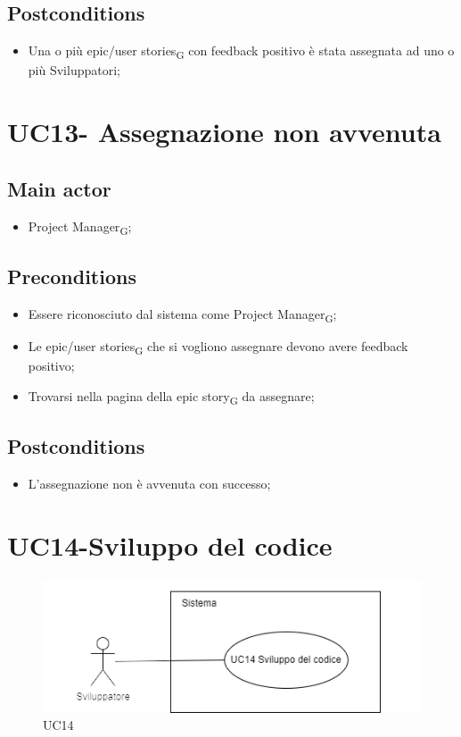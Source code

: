 \documentclass{article}
\begin{document}
    \subsection*{Postconditions}
        \begin{itemize}
            \item Una o più epic/user stories\textsubscript{G} con feedback positivo è stata assegnata ad uno o più Sviluppatori;
        \end{itemize}

\section{UC13- Assegnazione non avvenuta}

       \subsection*{Main actor}
    \begin{itemize}
        \item Project Manager\textsubscript{G};
    \end{itemize}
    
    \subsection*{Preconditions}
        \begin{itemize}
            \item Essere riconosciuto dal sistema come Project Manager\textsubscript{G};
            \item Le epic/user stories\textsubscript{G} che si vogliono assegnare devono avere feedback positivo;
            \item Trovarsi nella pagina della epic story\textsubscript{G} da assegnare;
        \end{itemize}
        
    \subsection*{Postconditions}
        \begin{itemize}
            \item L'assegnazione non è avvenuta con successo;
        \end{itemize}
    
\section{UC14-Sviluppo del codice}
    \begin{figure}[h]
      \centering
      \includegraphics{./imgUML/UC14.png}
    \caption{UC14}
      \label{fig:UC14}
    \end{figure}
    
\end{document}
